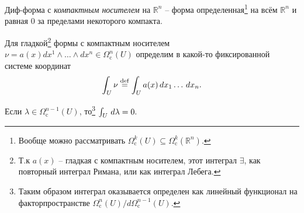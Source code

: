
\begin{to_def} 
\label{def_compact_form}
    Диф-форма с \textit{компактным носителем} на $\mathbb{R}^n$ -- форма определенная\footnote{
        Вообще можно рассматривать $\Omega_\text{c}^k (U) \subseteq \Omega_\text{c}^k (\mathbb{R}^n)$.
    } на всём $\mathbb{R}^n$ и равная $0$ за пределами некоторого компакта. 
\end{to_def}

\begin{to_def} 
\label{def_6.98}
    Для гладкой\footnote{
        Т.к $a(x)$ -- гладкая с компактным носителем, этот интеграл $\exists$, как повторный интеграл Римана, или как интеграл Лебега.
    } формы с компактным носителем $\nu = a(x) dx^1 \wedge \ldots \wedge dx^n \in \Omega_\text{c}^n (U)$ определим в какой-то фиксированной системе координат
    \begin{equation*}
         \int_U \nu \overset{\mathrm{def}}{=} \int_U a(x) \, d x_1 \ldots \, d x_n.
     \end{equation*} 
\end{to_def}


\begin{to_lem} 
\label{lem_6.99}
    Если $\lambda \in \Omega_\text{c}^{n-1}(U)$, то\footnote{
        Таким образом интеграл оказывается определен как линейный функционал на факторпространстве $\Omega_{\text{c}}^n(U) / d \Omega_{\text{c}}^{n-1}(U)$.
    }
    $\int_U \, d \lambda = 0.$
\end{to_lem}
  



